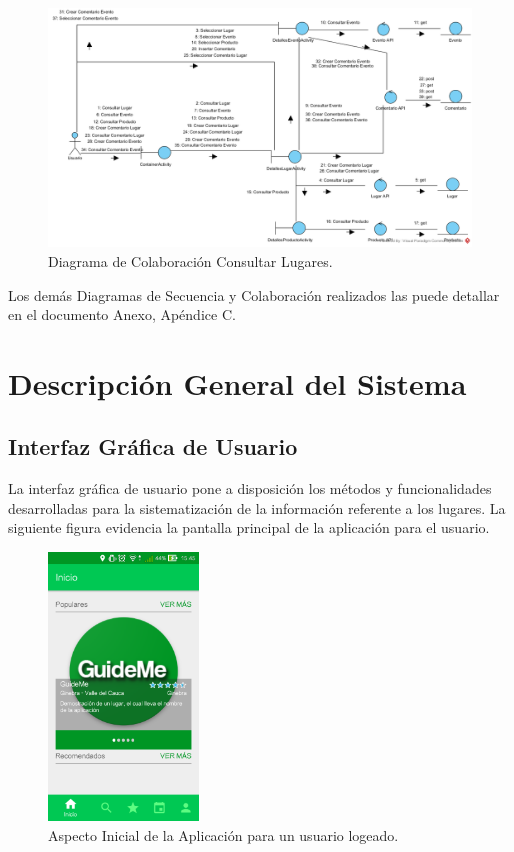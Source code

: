 \documentclass[12pt,letterpaper,openany]{book}
\begin{document}
\begin{figure}[H]
\begin{center}
\includegraphics[width=14cm]{./imagenes/DC/DC_consultar_lugar}
\caption{Diagrama de Colaboración Consultar Lugares.}
\end{center}
\end{figure}

Los demás Diagramas de Secuencia y Colaboración realizados las puede detallar en el documento Anexo, Apéndice C.

\section{Descripción General del Sistema}
\subsection{Interfaz Gráfica de Usuario}
La interfaz gráfica de usuario pone a disposición los métodos y funcionalidades desarrolladas para la sistematización de la información referente a los lugares. La siguiente figura evidencia la pantalla principal de la aplicación para el usuario.

\begin{figure}[H]
\begin{center}
\includegraphics[width=4cm]{./imagenes/gui}
\caption{Aspecto Inicial de la Aplicación para un usuario logeado.}
\end{center}
\end{figure}
\end{document}
